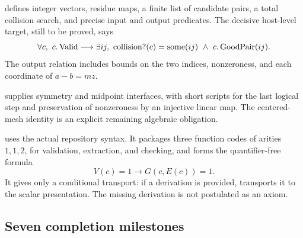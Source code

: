  defines integer vectors,
residue maps, a finite list of candidate pairs,
a total collision search, and precise input and
output predicates. The decisive host-level target,
still to be proved, says
\[
 \forall c,\ c.\Valid\longrightarrow
 \exists ij,\ 
 \operatorname{collision?}(c)=\operatorname{some}(ij)
 \ \wedge\ c.\operatorname{GoodPair}(ij).
\]
The output relation includes bounds on the two
indices, nonzeroness, and each coordinate of
\(a-b=mz\).

 supplies symmetry and
midpoint interfaces, with short scripts for the
last logical step and preservation of nonzeroness
by an injective linear map.
The centered-mesh identity is an explicit remaining
algebraic obligation.

 uses the actual repository
syntax. It packages three function codes of arities
\(1,1,2\), for validation, extraction, and checking,
and forms the quantifier-free formula
\[
                         V(c)=1\longrightarrow G(c,E(c))=1.
\]
It gives only a conditional transport: if a
 derivation is provided,
 transports it to the scalar
presentation. The missing derivation is not
postulated as an axiom.

\subsection{Seven completion milestones}

